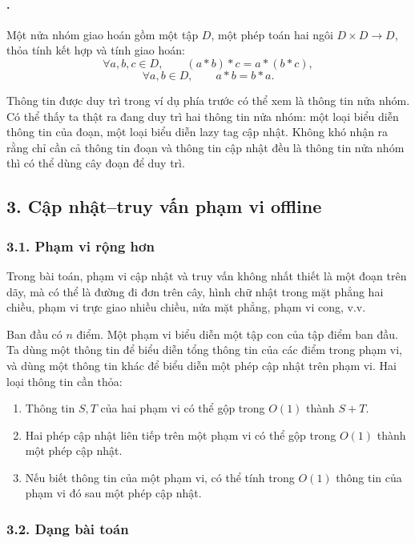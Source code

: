 \documentclass[11pt]{article}
\begin{document}
\paragraph{.}
Một nửa nhóm giao hoán gồm một tập \(D\), một phép toán hai ngôi
\(D\times D\to D\), thỏa tính kết hợp và tính giao hoán:
\[
  \forall a,b,c\in D,\qquad (a*b)*c=a*(b*c),
\]
\[
  \forall a,b\in D,\qquad a*b=b*a.
\]

Thông tin được duy trì trong ví dụ phía trước có thể xem là thông tin nửa
nhóm. Có thể thấy ta thật ra đang duy trì hai thông tin nửa nhóm: một loại biểu
diễn thông tin của đoạn, một loại biểu diễn lazy tag cập nhật. Không khó nhận
ra rằng chỉ cần cả thông tin đoạn và thông tin cập nhật đều là thông tin nửa
nhóm thì có thể dùng cây đoạn để duy trì.

\subsection*{3. Cập nhật--truy vấn phạm vi offline}

\subsubsection*{3.1. Phạm vi rộng hơn}

Trong bài toán, phạm vi cập nhật và truy vấn không nhất thiết là một đoạn trên
dãy, mà có thể là đường đi đơn trên cây, hình chữ nhật trong mặt phẳng hai
chiều, phạm vi trực giao nhiều chiều, nửa mặt phẳng, phạm vi cong, v.v.

Ban đầu có \(n\) điểm. Một phạm vi biểu diễn một tập con của tập điểm ban đầu.
Ta dùng một thông tin để biểu diễn tổng thông tin của các điểm trong phạm vi,
và dùng một thông tin khác để biểu diễn một phép cập nhật trên phạm vi. Hai
loại thông tin cần thỏa:
\begin{enumerate}
  \item Thông tin \(S,T\) của hai phạm vi có thể gộp trong \(O(1)\) thành
  \(S+T\).
  \item Hai phép cập nhật liên tiếp trên một phạm vi có thể gộp trong \(O(1)\)
  thành một phép cập nhật.
  \item Nếu biết thông tin của một phạm vi, có thể tính trong \(O(1)\) thông
  tin của phạm vi đó sau một phép cập nhật.
\end{enumerate}

\subsubsection*{3.2. Dạng bài toán}
\end{document}
